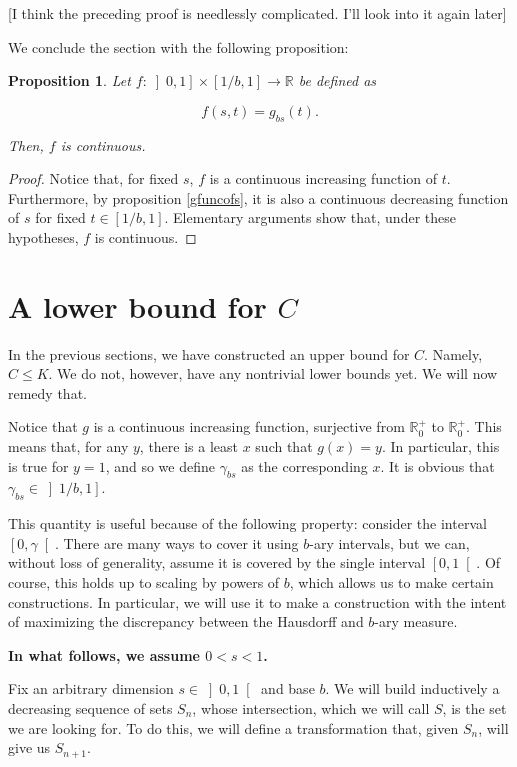 \documentclass[11pt, reqno]{amsart}
\newcommand{\R}{\mathbb{R}}
\newtheorem{prop}{Proposition}
\begin{document}
[I think the preceding proof is needlessly complicated. I'll look into it again later]

We conclude the section with the following proposition:

\begin{prop}
Let $f : \left]0, 1\right] \times \left[1/b, 1\right] \to \R$ be defined as

\[f(s, t) = g_{bs}(t).\]

Then, $f$ is continuous.
\end{prop}

\begin{proof}
Notice that, for fixed $s$, $f$ is a continuous increasing function of $t$. Furthermore, by proposition \ref{gfuncofs}, it is also a continuous decreasing function of $s$ for fixed $t \in \left[1/b, 1 \right]$. Elementary arguments show that, under these hypotheses, $f$ is continuous. %
\end{proof}

\section{A lower bound for $C$}\label{seclowerbound}

In the previous sections, we have constructed an upper bound for $C$. Namely, $C \leq K$. We do not, however, have any nontrivial lower bounds yet. We will now remedy that.

Notice that $g$ is a continuous increasing function, surjective from $\R^+_0$ to $\R^+_0$. This means that, for any $y$, there is a least $x$ such that $g(x) = y$. In particular, this is true for $y = 1$, and so we define $\gamma_{bs}$ as the corresponding $x$. It is obvious that $\gamma_{bs} \in \left] 1/b, 1 \right]$.

This quantity is useful because of the following property: consider the interval $\left[0, \gamma \right[$. There are many ways to cover it using $b$-ary intervals, but we can, without loss of generality, assume it is covered by the single interval $\left[0, 1 \right[$. Of course, this holds up to scaling by powers of $b$, which allows us to make certain constructions. In particular, we will use it to make a construction with the intent of maximizing the discrepancy between the Hausdorff and $b$-ary measure.

\textbf{In what follows, we assume $0 < s < 1$.}

Fix an arbitrary dimension $s \in \left]0, 1 \right[$ and base $b$. We will build inductively a decreasing sequence of sets $S_n$, whose intersection, which we will call $S$, is the set we are looking for. To do this, we will define a transformation that, given $S_n$, will give us $S_{n+1}$.
\end{document}
